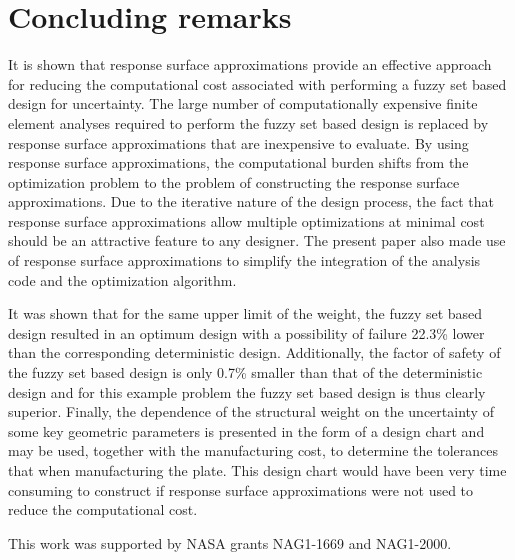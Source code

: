 \documentclass[stropt]{svjour}
\begin{document}

\section{Concluding remarks}
\label{sec07}

It is shown that response surface approximations provide an effective
approach for reducing the computational cost associated with performing a
fuzzy set based design for uncertainty.
The large number of computationally expensive finite element analyses required
to perform the fuzzy set based design is replaced by response surface
approximations that are inexpensive to evaluate.
By using response surface approximations, the computational burden shifts
from the optimization problem to the problem of constructing the response
surface approximations.
Due to the iterative nature of the design process, the fact that response
surface approximations allow multiple optimizations at minimal cost should be
an attractive feature to any designer.
The present paper also made use of response surface approximations to simplify
the integration of the analysis code and the optimization algorithm.

It was shown that for the same upper limit of the weight, the fuzzy set based
design resulted in an optimum design with a possibility of failure 22.3\%
lower than the corresponding deterministic design.
Additionally, the factor of safety of the fuzzy set based design is only 0.7\%
smaller than that of the deterministic design and for this example problem the
fuzzy set based design is thus clearly superior.
Finally, the dependence of the structural weight on the uncertainty of some
key geometric parameters is presented in the form of a design chart and may be
used, together with the manufacturing cost, to determine the tolerances that
when manufacturing the plate.
This design chart would have been very time consuming to construct if response
surface approximations were not used to reduce the computational cost.

\begin{acknowledgement}
This work was supported by NASA grants NAG1-1669 and NAG1-2000.
\end{acknowledgement}
\end{document}
